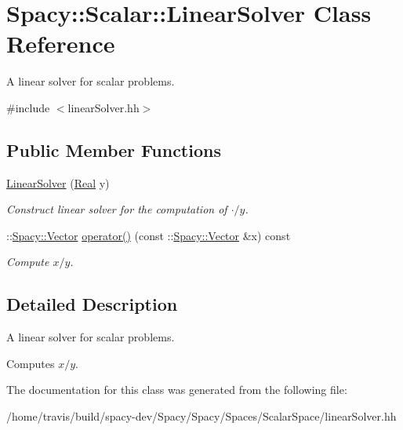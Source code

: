 \hypertarget{classSpacy_1_1Scalar_1_1LinearSolver}{\section{\-Spacy\-:\-:\-Scalar\-:\-:\-Linear\-Solver \-Class \-Reference}
\label{classSpacy_1_1Scalar_1_1LinearSolver}
}


\-A linear solver for scalar problems.  




{\ttfamily \#include $<$linear\-Solver.\-hh$>$}

\subsection*{\-Public \-Member \-Functions}
\begin{DoxyCompactItemize}
\item 
\hypertarget{classSpacy_1_1Scalar_1_1LinearSolver_af7d7759b5ee27d7a16640baf1fa663d9}{\hyperlink{classSpacy_1_1Scalar_1_1LinearSolver_af7d7759b5ee27d7a16640baf1fa663d9}{\-Linear\-Solver} (\hyperlink{classSpacy_1_1Real}{\-Real} y)}\label{classSpacy_1_1Scalar_1_1LinearSolver_af7d7759b5ee27d7a16640baf1fa663d9}

\begin{DoxyCompactList}\small\item\em \-Construct linear solver for the computation of $\cdot/y$. \end{DoxyCompactList}\item 
\hypertarget{classSpacy_1_1Scalar_1_1LinearSolver_a2acd32e9eede5a5e868c85a8f62b757b}{\-::\hyperlink{classSpacy_1_1Vector}{\-Spacy\-::\-Vector} \hyperlink{classSpacy_1_1Scalar_1_1LinearSolver_a2acd32e9eede5a5e868c85a8f62b757b}{operator()} (const \-::\hyperlink{classSpacy_1_1Vector}{\-Spacy\-::\-Vector} \&x) const }\label{classSpacy_1_1Scalar_1_1LinearSolver_a2acd32e9eede5a5e868c85a8f62b757b}

\begin{DoxyCompactList}\small\item\em \-Compute $x/y$. \end{DoxyCompactList}\end{DoxyCompactItemize}


\subsection{\-Detailed \-Description}
\-A linear solver for scalar problems. 

\-Computes $x/y$. 

\-The documentation for this class was generated from the following file\-:\begin{DoxyCompactItemize}
\item 
/home/travis/build/spacy-\/dev/\-Spacy/\-Spacy/\-Spaces/\-Scalar\-Space/linear\-Solver.\-hh\end{DoxyCompactItemize}
